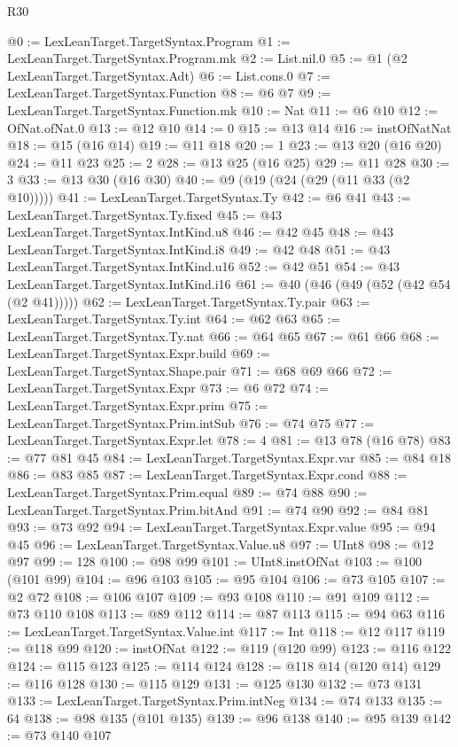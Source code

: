 \begin{lexlean}{R30}
\begin{coremodule}
@0 := LexLeanTarget.TargetSyntax.Program
@1 := LexLeanTarget.TargetSyntax.Program.mk
@2 := List.nil.{0}
@5 := @1 (@2 LexLeanTarget.TargetSyntax.Adt)
@6 := List.cons.{0}
@7 := LexLeanTarget.TargetSyntax.Function
@8 := @6 @7
@9 := LexLeanTarget.TargetSyntax.Function.mk
@10 := Nat
@11 := @6 @10
@12 := OfNat.ofNat.{0}
@13 := @12 @10
@14 := 0
@15 := @13 @14
@16 := instOfNatNat
@18 := @15 (@16 @14)
@19 := @11 @18
@20 := 1
@23 := @13 @20 (@16 @20)
@24 := @11 @23
@25 := 2
@28 := @13 @25 (@16 @25)
@29 := @11 @28
@30 := 3
@33 := @13 @30 (@16 @30)
@40 := @9 (@19 (@24 (@29 (@11 @33 (@2 @10)))))
@41 := LexLeanTarget.TargetSyntax.Ty
@42 := @6 @41
@43 := LexLeanTarget.TargetSyntax.Ty.fixed
@45 := @43 LexLeanTarget.TargetSyntax.IntKind.u8
@46 := @42 @45
@48 := @43 LexLeanTarget.TargetSyntax.IntKind.i8
@49 := @42 @48
@51 := @43 LexLeanTarget.TargetSyntax.IntKind.u16
@52 := @42 @51
@54 := @43 LexLeanTarget.TargetSyntax.IntKind.i16
@61 := @40 (@46 (@49 (@52 (@42 @54 (@2 @41)))))
@62 := LexLeanTarget.TargetSyntax.Ty.pair
@63 := LexLeanTarget.TargetSyntax.Ty.int
@64 := @62 @63
@65 := LexLeanTarget.TargetSyntax.Ty.nat
@66 := @64 @65
@67 := @61 @66
@68 := LexLeanTarget.TargetSyntax.Expr.build
@69 := LexLeanTarget.TargetSyntax.Shape.pair
@71 := @68 @69 @66
@72 := LexLeanTarget.TargetSyntax.Expr
@73 := @6 @72
@74 := LexLeanTarget.TargetSyntax.Expr.prim
@75 := LexLeanTarget.TargetSyntax.Prim.intSub
@76 := @74 @75
@77 := LexLeanTarget.TargetSyntax.Expr.let
@78 := 4
@81 := @13 @78 (@16 @78)
@83 := @77 @81 @45
@84 := LexLeanTarget.TargetSyntax.Expr.var
@85 := @84 @18
@86 := @83 @85
@87 := LexLeanTarget.TargetSyntax.Expr.cond
@88 := LexLeanTarget.TargetSyntax.Prim.equal
@89 := @74 @88
@90 := LexLeanTarget.TargetSyntax.Prim.bitAnd
@91 := @74 @90
@92 := @84 @81
@93 := @73 @92
@94 := LexLeanTarget.TargetSyntax.Expr.value
@95 := @94 @45
@96 := LexLeanTarget.TargetSyntax.Value.u8
@97 := UInt8
@98 := @12 @97
@99 := 128
@100 := @98 @99
@101 := UInt8.instOfNat
@103 := @100 (@101 @99)
@104 := @96 @103
@105 := @95 @104
@106 := @73 @105
@107 := @2 @72
@108 := @106 @107
@109 := @93 @108
@110 := @91 @109
@112 := @73 @110 @108
@113 := @89 @112
@114 := @87 @113
@115 := @94 @63
@116 := LexLeanTarget.TargetSyntax.Value.int
@117 := Int
@118 := @12 @117
@119 := @118 @99
@120 := instOfNat
@122 := @119 (@120 @99)
@123 := @116 @122
@124 := @115 @123
@125 := @114 @124
@128 := @118 @14 (@120 @14)
@129 := @116 @128
@130 := @115 @129
@131 := @125 @130
@132 := @73 @131
@133 := LexLeanTarget.TargetSyntax.Prim.intNeg
@134 := @74 @133
@135 := 64
@138 := @98 @135 (@101 @135)
@139 := @96 @138
@140 := @95 @139
@142 := @73 @140 @107

\end{coremodule}
\end{lexlean}
